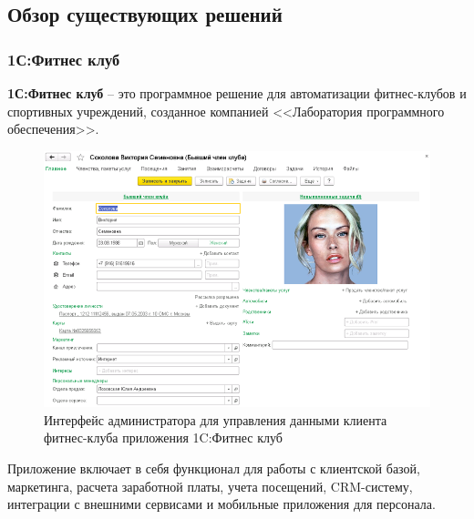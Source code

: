 \subsection{Обзор существующих решений}

\subsubsection*{1С:Фитнес клуб}

\textbf{1С:Фитнес клуб} -- это программное решение для автоматизации фитнес-клубов и спортивных учреждений, созданное компанией <<Лаборатория программного обеспечения>>. 

\begin{figure}[ht!]
	\begin{center}
		\includegraphics[scale=0.46]{./img/1c-1.png}
	\end{center}
	\caption{Интерфейс администратора для управления данными клиента фитнес-клуба приложения 1C:Фитнес клуб}
	\label{fig:1c-1}
\end{figure}

Приложение включает в себя функционал для работы с клиентской базой, маркетинга, расчета заработной платы, учета посещений, CRM-систему, интеграции с внешними сервисами и мобильные приложения для персонала. 

